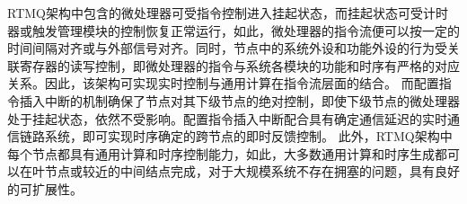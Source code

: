 RTMQ架构中包含的微处理器可受指令控制进入挂起状态，而挂起状态可受计时器或触发管理模块的控制恢复正常运行，如此，微处理器的指令流便可以按一定的时间间隔对齐或与外部信号对齐。同时，节点中的系统外设和功能外设的行为受关联寄存器的读写控制，即微处理器的指令与系统各模块的功能和时序有严格的对应关系。因此，该架构可实现实时控制与通用计算在指令流层面的结合。
而配置指令插入中断的机制确保了节点对其下级节点的绝对控制，即使下级节点的微处理器处于挂起状态，依然不受影响。配置指令插入中断配合具有确定通信延迟的实时通信链路系统，即可实现时序确定的跨节点的即时反馈控制。
此外，RTMQ架构中每个节点都具有通用计算和时序控制能力，如此，大多数通用计算和时序生成都可以在叶节点或较近的中间结点完成，对于大规模系统不存在拥塞的问题，具有良好的可扩展性。









